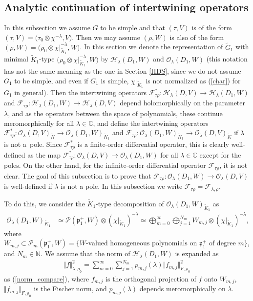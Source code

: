 \documentclass[pdftex]{sigma}
\numberwithin{equation}{section}
\newcommand{\BN}{\mathbb{N}}
\newcommand{\BC}{\mathbb{C}}
\newcommand{\fp}{\mathfrak{p}}
\newcommand{\cF}{\mathcal{F}}
\newcommand{\cH}{\mathcal{H}}
\newcommand{\cO}{\mathcal{O}}
\newcommand{\cP}{\mathcal{P}}
\begin{document}
\subsection{Analytic continuation of intertwining operators}
 In this subsection we assume $G$ to be simple and that $(\tau,V)$ is of the form $(\tau,V)=\big(\tau_0\otimes\chi^{-\lambda},V\big)$.
Then we may assume $(\rho,W)$ is also of the form $(\rho,W)=\big(\rho_0\otimes\chi|_{\tilde{K}_1}^{-\lambda},W\big)$.
In this section we denote the representation of $\tilde{G}_1$
with minimal $\tilde{K}_1$-type $\big(\rho_0\otimes\chi|_{\tilde{K}_1}^{-\lambda},W\big)$ by $\cH_\lambda(D_1,W)$ and $\cO_\lambda(D_1,W)$
(this notation has not the same meaning as the one in Section \ref{HDS}, since we do not assume $G_1$ to be simple,
and even if $G_1$ is simple, $\chi|_{\tilde{K}_1}$ is not normalized as (\ref{char}) for $G_1$ in general).
Then the intertwining operators $\cF_{\tau\rho}^*\colon \cH_\lambda(D,V)\to\cH_\lambda(D_1,W)$ and $\cF_{\tau\rho}\colon \cH_\lambda(D_1,W)\to\cH_\lambda(D,V)$ depend
holomorphically on the parameter $\lambda$, and as the operators between the space of polynomials, these continue meromorphically for
all $\lambda\in\BC$, and define the intertwining operators $\cF_{\tau\rho}^*\colon \cO_\lambda(D,V)_{\tilde{K}}\to\cO_\lambda(D_1,W)_{\tilde{K}_1}$ and
$\cF_{\tau\rho}\colon \cO_\lambda(D_1,W)_{\tilde{K}_1}\to\cO_\lambda(D,V)_{\tilde{K}}$ if $\lambda$ is not a~pole.
Since $\cF_{\tau\rho}^*$ is a finite-order differential operator, this is clearly well-defined as the map
$\cF_{\tau\rho}^*\colon \cO_\lambda(D,V)\to\cO_\lambda(D_1,W)$ for all $\lambda\in\BC$ except for the poles. On the other hand,
for the infinite-order differential operator $\cF_{\tau\rho}$, it is not clear. The goal of this subsection is to prove that
$\cF_{\tau\rho}\colon \cO_\lambda(D_1,W)\to\cO_\lambda(D,V)$ is well-defined if $\lambda$ is not a pole.
In this subsection we write $\cF_{\tau\rho}=\cF_{\lambda,\rho}$.

To do this, we consider the $\tilde{K}_1$-type decomposition of $\cO_\lambda(D_1,W)_{\tilde{K}_1}$ as
\begin{align*}
\cO_\lambda(D_1,W)_{\tilde{K}_1}&\simeq \cP(\fp^+_1,W)\otimes(\chi|_{\tilde{K}_1})^{-\lambda}
\simeq \bigoplus_{m=0}^\infty \bigoplus_{j=1}^{N_m} W_{m,j}\otimes(\chi|_{\tilde{K}_1})^{-\lambda},
\end{align*}
where $W_{m,j}\subset\cP_m(\fp^+_1,W)=\{W\text{-valued homogeneous polynomials on }\fp^+_1\text{ of degree }m\}$, and $N_m\in\BN$.
We assume that the norm of $\cH_\lambda(D_1,W)$ is expanded as
\begin{gather}\label{assumption_decomposition}
\Vert f\Vert_{\lambda,\rho_0}^2=\sum_{m=0}^\infty \sum_{j=1}^{N_m}p_{m,j}(\lambda)\Vert f_{m,j}\Vert_{F,\rho_0}^2
\end{gather}
as (\ref{norm_compare}), where $f_{m,j}$ is the orthogonal projection of $f$ onto $W_{m,j}$, $\Vert f_{m,j}\Vert_{F,\rho_0}$ is the Fischer norm,
and $p_{m,j}(\lambda)$ depends meromorphically on $\lambda$.
\end{document}
